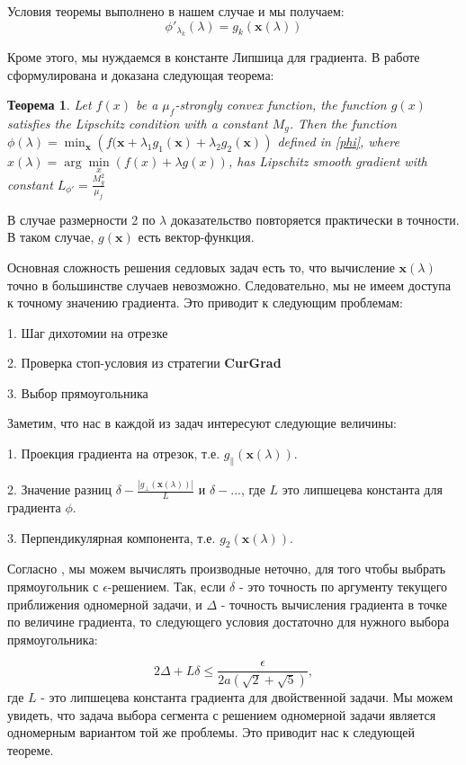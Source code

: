 \documentclass[12pt]{article}
\newtheorem{theorem}{Теорема}[section]
\begin{document}
Условия теоремы выполнено в нашем случае и мы получаем:
\begin{equation}
\phi'_{\lambda_k}(\lambda) = g_k\left(\textbf{x}(\lambda)\right)
\end{equation}

Кроме этого, мы нуждаемся в константе Липшица для градиента. В работе \cite{Stonykin} сформулирована и доказана следующая теорема:
\begin{theorem}
Let $f(x)$ be a $\mu_f$-strongly convex function, the function $g(x)$ satisfies the Lipschitz condition with a constant $M_g$. Then the function $\phi(\lambda) = \min_\textbf{x}\left(f(\textbf{x}+\lambda_1g_1(\textbf{x}) + \lambda_2g_2(\textbf{x})\right)$ defined in \ref{phi}, where $x(\lambda) = \arg\min\limits_x(f(x)+\lambda g(x))$, has Lipschitz smooth gradient with constant $L_{\phi'} = \frac{M_g^2}{\mu_f}$
\end{theorem}

В случае размерности 2 по $\lambda$ доказательство повторяется практически в точности. В таком случае, $g(\textbf{x})$ есть вектор-функция.

Основная сложность решения седловых задач есть то, что вычисление $\textbf{x}(\lambda)$ точно в большинстве случаев невозможно. Следовательно, мы не имеем доступа к точному значению градиента. Это приводит к следующим проблемам:

1. Шаг дихотомии на отрезке

2. Проверка стоп-условия из стратегии \textbf{CurGrad}

3. Выбор прямоугольника

Заметим, что нас в каждой из задач интересуют следующие величины:

1. Проекция градиента на отрезок, т.е. $g_\parallel(\textbf{x}(\lambda))$.

2. Значение разниц $\delta-\frac{|g_\perp(\textbf{x}(\lambda))|}{L}$ и $\delta-...$, где $L$ это липшецева константа для градиента $\phi$.

3. Перпендикулярная компонента, т.е. $g_2(\textbf{x}(\lambda))$.

Согласно \cite{Ston_Pas}, мы можем вычислять производные неточно, для того чтобы выбрать прямоугольник с $\epsilon$-решением. Так, если $\delta$ - это точность по аргументу текущего приближения одномерной задачи, и $\Delta$ - точность вычисления градиента в точке по величине градиента, то следующего условия достаточно для нужного выбора прямоугольника:

$$2\Delta + L\delta \leq \frac{\epsilon}{2a(\sqrt{2}+\sqrt{5})},$$
где $L$ - это липшецева константа градиента для двойственной задачи. Мы можем увидеть, что задача выбора сегмента с решением одномерной задачи является одномерным вариантом той же проблемы. Это приводит нас к следующей теореме.
\end{document}

